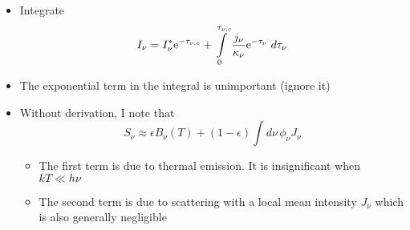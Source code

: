 \documentclass[12pt,letterpaper]{article}
\begin{document}
\begin{Aenumerate}
\begin{itemize}
\begin{itemize}
	\item Integrate
	\begin{equation}
	I_\nu = I_\nu^* {\rm e}^{-\tau_{\nu,c}} + 
		\int\limits_0^{\tau_{\nu,c}} \frac{j_\nu}{\kappa_\nu} {\rm e}^{-\tau_\nu}
		\; d\tau_\nu
	\end{equation}
	\item The exponential term in the integral is unimportant (ignore it)
	\item Without derivation, I note that 
	\begin{equation}
	S_\nu \approx \epsilon B_\nu(T) + (1-\epsilon) \int d\nu \, \phi_\nu J_\nu
	\end{equation}
		\begin{itemize}
		\item The first term is due to thermal emission.  It is insignificant
		when $kT \ll h\nu$
		\item The second term is due to scattering with a 
		local mean intensity $J_\nu$ which is also generally
		negligible
		\end{itemize}
	\end{itemize}

\end{itemize}
\end{Aenumerate}
\end{document}
